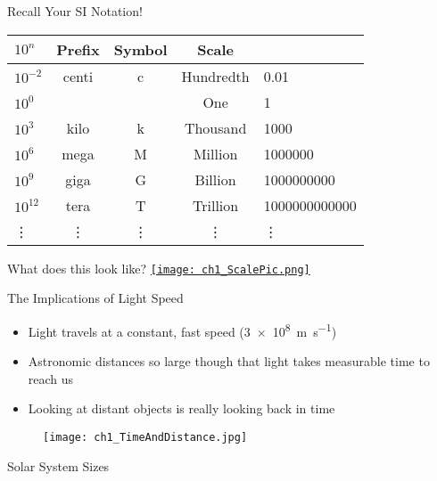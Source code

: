 \documentclass[pdf,aspectratio=169]{beamer}
\begin{document}
\begin{frame}{Recall Your SI Notation!}
  \begin{table}
	\centering
	\begin{tabular}{lcccl}
	  \toprule
	  $10^n$ & Prefix & Symbol & Scale \\
	  \midrule
	  $10^{-2}$ & centi & c & Hundredth & 0.01 \\
	  $10^0$ & & & One  & 1\\
	  $10^3$ & kilo & k & Thousand & 1000 \\
	  $10^6$ & mega & M & Million & 1000000 \\
	  $10^9$ & giga & G & Billion & 1000000000\\
	  $10^{12}$ & tera & T & Trillion & 1000000000000 \\
	  \vdots & \vdots & \vdots &\vdots & \vdots \\
	  \bottomrule
	\end{tabular}
  \end{table}
\end{frame}

\begin{frame}{What does this look like?}
  \href{http://htwins.net/scale2/}{\texttt{[image: ch1\_ScalePic.png]}}
\end{frame}

\begin{frame}{The Implications of Light Speed}
  \begin{itemize}
	\item Light travels at a constant, fast speed (\SI{3e8}{\meter\per\second})
	\item Astronomic distances so large though that light takes measurable time to reach us
	\item Looking at distant objects is really looking back in time
  \end{itemize}
  \begin{figure}[h!]
	\centering
	\texttt{[image: ch1\_TimeAndDistance.jpg]}
  \end{figure}
\end{frame}

\begin{frame}{Solar System Sizes}
  \centering
\end{frame}
\end{document}
